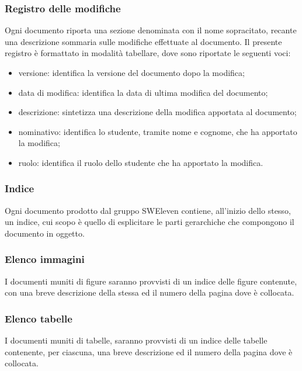 \subsubsection{Registro delle modifiche}
Ogni documento riporta una sezione denominata con il nome sopracitato, recante una descrizione sommaria sulle modifiche effettuate al documento. Il presente registro è formattato in modalità tabellare, dove sono riportate le seguenti voci:	
\begin{itemize}
	\item versione: identifica la versione del documento dopo la modifica;
	\item data di modifica: identifica la data di ultima modifica del documento;
	\item descrizione: sintetizza una descrizione della modifica apportata al documento;
	\item nominativo: identifica lo studente, tramite nome e cognome, che ha apportato la modifica;
	\item ruolo: identifica il ruolo dello studente che ha apportato la modifica.
\end{itemize}

\subsubsection{Indice}
Ogni documento prodotto dal gruppo SWEleven contiene, all’inizio dello stesso, un indice, cui scopo è quello di esplicitare le parti gerarchiche che compongono il documento in oggetto. 

\subsubsection{Elenco immagini}
I documenti muniti di figure saranno provvisti di un indice delle figure contenute, con una breve descrizione della stessa ed il numero della pagina dove è collocata.

\subsubsection{Elenco tabelle}
I documenti muniti di tabelle, saranno provvisti di un indice delle tabelle contenente, per
ciascuna, una breve descrizione ed il numero della pagina dove è collocata.

